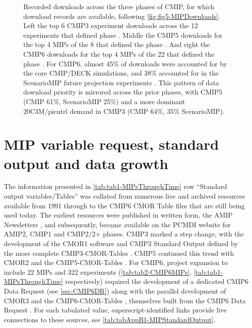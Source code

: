\documentclass[manuscript]{copernicus}
\def\cred#1{{\color{red}#1}}
\begin{document}
\begin{figure}
    \centering
    
    \caption{Recorded downloads across the three phases of CMIP, for which download records are available, following \autoref{fig:fig5-MIPDownloads}. Left the top 6 CMIP3 experiment downloads across the 12 experiments that defined phase \citep{meehl_wcrp_2007}. Middle the CMIP5 downloads for the top 4 MIPs of the 8 that defined the phase \citep[\autoref{tab:tabAppA1-MIPExperiments};][]{taylor_overview_2012}. And right the CMIP6 downloads for the top 4 MIPs of the 22 that defined the phase \cite[[see \autoref{tab:tab2-CMIP6MIPs};][]{eyring_overview_2016}. For CMIP6, almost 45\% of downloads were accounted for by the core CMIP/DECK simulations, and 38\% accounted for in the ScenarioMIP future projection experiments \citep{oneill_scenario_2016}. This pattern of data download priority is mirrored across the prior phases, with CMIP5 (CMIP 61\%, ScenarioMIP 25\%) and a more dominant 20C3M/picntrl demand in CMIP3 (CMIP 64\%, 35\% ScenarioMIP).}
    \label{fig:figA1-MIPDownloads}
\end{figure}



\section{MIP variable request, standard output and data growth}  %
\label{sec:secAppB1-MIPStandardOutput}
The information presented in \autoref{tab:tab1-MIPsThroughTime} row ``Standard output variables/Tables'' was collated from numerous live and archived resources available from 1991 through to the CMIP6 CMOR Table files that are still being used today. The earliest resources were published in written form, the AMIP Newsletters \citep[e.g.,][]{gates_amip_1991}, and subsequently, became available on the PCMDI website for AMIP2, CMIP1 and CMIP2/2+ phases. CMIP3 marked a step change, with the development of the CMOR1 software \citep{taylor_cmor_2006} and CMIP3 Standard Output defined by the more complete CMIP3-CMOR-Tables \citep{doutriaux_cmip3_2005}. CMIP5 continued this trend with CMOR2 \citep{doutriaux_cmor_2011} and the CMIP5-CMOR-Tables \citep{doutriaux_cmip5_2013}. For CMIP6, project expansion to include 22 MIPs and 322 experiments (\autoref{tab:tab2-CMIP6MIPs}, \autoref{tab:tab1-MIPsThroughTime} respectively) required the development of a dedicated CMIP6 Data Request (see \autoref{sec:CMIP6DR}) along with the parallel development of CMOR3 \citep{mauzey_climate_2025} and the CMIP6-CMOR-Tables \citep{nadeau_cmip6_2017}, themselves built from the CMIP6 Data Request \citep{juckes_cmip6_2020}. For each tabulated value, superscript-identified links provide live connections to these sources, see \autoref{tab:tabAppB1-MIPStandardOutput}.
\end{document}
